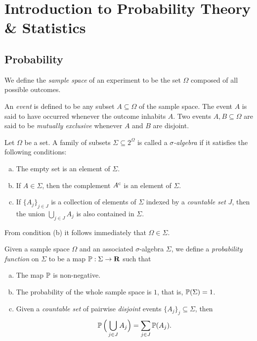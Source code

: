 \chapter{Introduction to Probability Theory \& Statistics}

\section{Probability}

\begin{definition}
\label{def:sample-space}
We define the \emph{sample space} of an experiment to be the set \(\Omega\)
composed of all possible outcomes.

An \emph{event} is defined to be any subset \(A \subseteq \Omega\) of the sample
space. The event \(A\) is said to have occurred whenever the outcome inhabits
\(A\). Two events \(A, B \subseteq \Omega\) are said to be \emph{mutually
  exclusive} whenever \(A\) and \(B\) are disjoint.
\end{definition}

\begin{definition}
\label{def:sigma-algebra}
Let \(\Omega\) be a set. A family of subsets \(\Sigma \subseteq 2^{\Omega}\) is called
a \emph{\(\sigma\)-algebra} if it satisfies the following conditions:
\begin{enumerate}[(a)]\setlength\itemsep{0em}
\item The empty set is an element of \(\Sigma\).
\item If \(A \in \Sigma\), then the complement \({A}^{\text{c}}\) is an
  element of \(\Sigma\).
\item If \(\{A_j\}_{j \in J}\) is a collection of elements of \(\Sigma\)
  indexed by a \emph{countable set} \(J\), then the union
  \(\bigcup_{j \in J} A_j\) is also contained in \(\Sigma\).
\end{enumerate}
From condition (b) it follows immediately that \(\Omega \in \Sigma\).
\end{definition}

\begin{definition}
\label{def:probability-function}
Given a sample space \(\Omega\) and an associated \(\sigma\)-algebra \(\Sigma\),
we define a \emph{probability function} on \(\Sigma\) to be a map
\(\operatorname{\mathbb{P}}: \Sigma \to \mathbf{R}\) such that
\begin{enumerate}[(a)]\setlength\itemsep{0em}
\item The map \(\operatorname{\mathbb{P}}\) is non-negative.
\item The probability of the whole sample space is \(1\), that is,
  \(\operatorname{\mathbb{P}}(\Sigma) = 1\).
\item Given a \emph{countable set} of pairwise \emph{disjoint} events
  \(\{A_j\}_{j} \subseteq \Sigma\), then
  \[
  \operatorname{\mathbb{P}}\Big( \bigcup_{j \in J} A_j \Big) = \sum_{j \in J} \operatorname{\mathbb{P}}(A_j).
  \]
\end{enumerate}
\end{definition}

